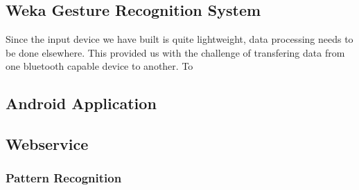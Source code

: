 \subsection{Weka Gesture Recognition System}
Since the input device we have built is quite lightweight, data processing needs to be done elsewhere.
This provided us with the challenge of transfering data from one bluetooth capable device to another.
To 

\subsection{Android Application}

\subsection{Webservice}


\subsubsection{Pattern Recognition}